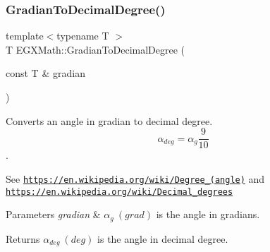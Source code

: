 \subsubsection{\texorpdfstring{Gradian\+To\+Decimal\+Degree()}{GradianToDecimalDegree()}}
{\footnotesize\ttfamily template$<$typename T $>$ \\
T E\+G\+X\+Math\+::\+Gradian\+To\+Decimal\+Degree (\begin{DoxyParamCaption}\item[{const T \&}]{gradian }\end{DoxyParamCaption})}



Converts an angle in gradian to decimal degree. \[\alpha_{deg}=\alpha_{g}\frac{9}{10}\]. 

See \href{https://en.wikipedia.org/wiki/Degree_(angle)}{\tt https\+://en.\+wikipedia.\+org/wiki/\+Degree\+\_\+(angle)} and \href{https://en.wikipedia.org/wiki/Decimal_degrees}{\tt https\+://en.\+wikipedia.\+org/wiki/\+Decimal\+\_\+degrees} 
\begin{DoxyParams}{Parameters}
{\em gradian} & $\alpha_{g}\ (grad)$ is the angle in gradians. \\
\hline
\end{DoxyParams}
\begin{DoxyReturn}{Returns}
$\alpha_{deg}\ (deg)$ is the angle in decimal degree. 
\end{DoxyReturn}
